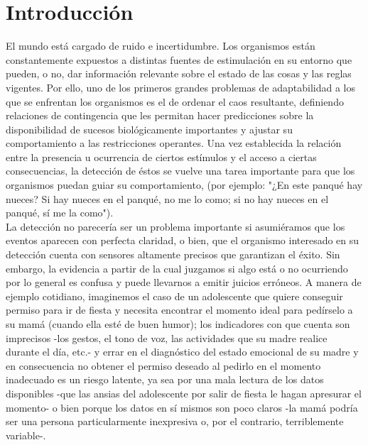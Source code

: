 
\chapter{Introducción} %

\label{Chapter1} %


\newcommand{\keyword}[1]{\textbf{#1}}
\newcommand{\tabhead}[1]{\textbf{#1}}
\newcommand{\code}[1]{\texttt{#1}}
\newcommand{\file}[1]{\texttt{\bfseries#1}}
\newcommand{\option}[1]{\texttt{\itshape#1}}


El mundo está cargado de ruido e incertidumbre. Los organismos están constantemente expuestos a distintas fuentes de estimulación en su entorno que pueden, o no, dar información relevante sobre el estado de las cosas y las reglas vigentes. Por ello, uno de los primeros grandes problemas de adaptabilidad a los que se enfrentan los organismos es el de ordenar el caos resultante, definiendo relaciones de contingencia que les permitan hacer predicciones sobre la disponibilidad de sucesos biológicamente importantes y ajustar su comportamiento a las restricciones operantes. Una vez establecida la relación entre la presencia u ocurrencia de ciertos estímulos y el acceso a ciertas consecuencias, la detección de éstos se vuelve una tarea importante para que los organismos puedan guiar su comportamiento, (por ejemplo: "¿En este panqué hay nueces? Si hay nueces en el panqué, no me lo como; si no hay nueces en el panqué, sí me la como").\\


La detección no parecería ser un problema importante si asumiéramos que los eventos aparecen con perfecta claridad, o bien, que el organismo interesado en su detección cuenta con sensores altamente precisos que garantizan el éxito. Sin embargo, la evidencia a partir de la cual juzgamos si algo está o no ocurriendo por lo general es confusa y puede llevarnos a emitir juicios erróneos. A manera de ejemplo cotidiano, imaginemos el caso de un adolescente que quiere conseguir permiso para ir de fiesta y necesita encontrar el momento ideal para pedírselo a su mamá (cuando ella esté de buen humor); los indicadores con que cuenta son imprecisos -los gestos, el tono de voz, las actividades que su madre realice durante el día, etc.- y errar en el diagnóstico del estado emocional de su madre y en consecuencia no obtener el permiso deseado al pedirlo en el momento inadecuado es un riesgo latente, ya sea por una mala lectura de los datos disponibles -que las ansias del adolescente por salir de fiesta le hagan apresurar el momento- o bien porque los datos en sí mismos son poco claros -la mamá podría ser una persona particularmente inexpresiva o, por el contrario, terriblemente variable-.\\ 

